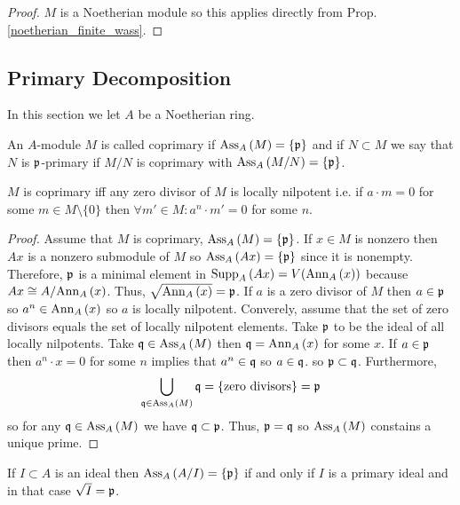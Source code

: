 \documentclass[12pt]{article}
\begin{document}
\begin{proof}
$M$ is a Noetherian module so this applies directly from Prop. \ref{noetherian_finite_wass}.
\end{proof}

\subsection{Primary Decomposition}

\begin{rmk}
In this section we let $A$ be a Noetherian ring.
\end{rmk}

\begin{definition}
An $A$-module $M$ is called coprimary if $\mathrm{Ass}_{A}\left( M \right) = \{\mathfrak{p}\}$ and if $N \subset M$ we say that $N$ is $\mathfrak{p}$-primary if $M / N$ is coprimary with $\mathrm{Ass}_{A}\left( M/N \right) = \{ \mathfrak{p} \}$.  
\end{definition}

\begin{lemma}
$M$ is coprimary iff any zero divisor of $M$ is locally nilpotent i.e. if $a \cdot m = 0$ for some $m \in M \setminus \{0\}$ then $\forall m' \in M : a^n \cdot m' = 0$ for some $n$. 
\end{lemma}

\begin{proof}
Assume that $M$ is coprimary, $\mathrm{Ass}_{A}\left( M \right) = \{ \mathfrak{p} \}$. If $x \in M$ is nonzero then $Ax$ is a nonzero submodule of $M$ so $\mathrm{Ass}_{A}\left( Ax \right) = \{ \mathfrak{p} \}$ since it is nonempty. Therefore, $\mathfrak{p}$ is a minimal element in $\mathrm{Supp}_{A}\left(A x \right) = V(\mathrm{Ann}_{A}\left(x\right))$
because $Ax \cong A / \mathrm{Ann}_{A}\left(x\right)$. Thus, $\sqrt{\mathrm{Ann}_{A}\left(x\right)} = \mathfrak{p}$. If $a$ is a zero divisor of $M$ then $a \in \mathfrak{p}$ so $a^n \in \mathrm{Ann}_{A}\left(x\right)$ so $a$ is locally nilpotent. Converely, assume that the set of zero divisors equals the set of locally nilpotent elements. Take $\mathfrak{p}$ to be the ideal of all locally nilpotents. Take $\mathfrak{q} \in \mathrm{Ass}_{A}\left( M \right)$ then $\mathfrak{q} = \mathrm{Ann}_{A}\left(x\right)$ for some $x$. If $a \in \mathfrak{p}$ then $a^n \cdot x = 0$ for some $n$ implies that $a^n \in \mathfrak{q}$ so $a \in \mathfrak{q}$. so $\mathfrak{p} \subset \mathfrak{q}$. Furthermore,
\[ \bigcup_{\mathfrak{q} \in \mathrm{Ass}_{A}\left( M \right)} \mathfrak{q} = \{ \text{zero divisors} \} = \mathfrak{p} \]
so for any $\mathfrak{q} \in \mathrm{Ass}_{A}\left( M \right)$ we have $\mathfrak{q} \subset \mathfrak{p}$. Thus, $\mathfrak{p} = \mathfrak{q}$ so $\mathrm{Ass}_{A}\left( M \right)$ constains a unique prime.
\end{proof}

\begin{corollary}
If $I \subset A$ is an ideal then $\mathrm{Ass}_{A}\left( A / I \right) = \{ \mathfrak{p} \}$ if and only if $I$ is a primary ideal and in that case $\sqrt{I} = \mathfrak{p}$. 
\end{corollary}
\end{document}
